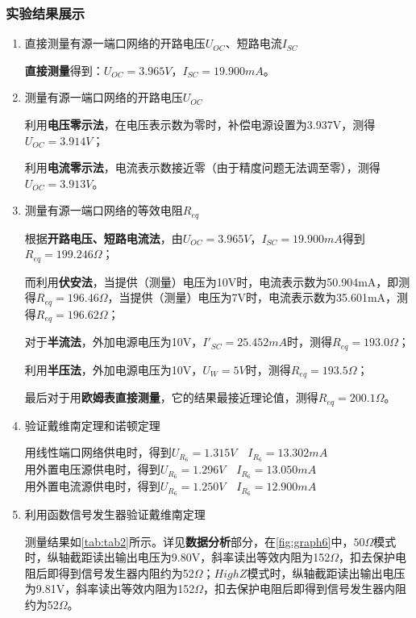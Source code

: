 \documentclass[dvipsnames, svgnames,a4paper,11pt]{article}
\begin{document}
	\subsubsection{实验结果展示}
	\begin{enumerate}
		\item 直接测量有源一端口网络的开路电压$U_{OC}$、短路电流$I_{SC}$
		
		\textbf{直接测量}得到：$U_{OC}=3.965V$，$I_{SC}=19.900mA$。
		
		\item 测量有源一端口网络的开路电压$U_{OC}$
		
		利用\textbf{电压零示法}，在电压表示数为零时，补偿电源设置为3.937V，测得$U_{OC}=3.914V$；
		
		利用\textbf{电流零示法}，电流表示数接近零（由于精度问题无法调至零），测得$U_{OC}=3.913V$。
		
		\item 测量有源一端口网络的等效电阻$R_{eq}$
		
		根据\textbf{开路电压、短路电流法}，由$U_{OC}=3.965V$，$I_{SC}=19.900mA$得到$R_{eq}=199.246\Omega$；
		
		而利用\textbf{伏安法}，当提供（测量）电压为10V时，电流表示数为50.904mA，即测得$R_{eq}=196.46\Omega$，当提供（测量）电压为7V时，电流表示数为35.601mA，测得$R_{eq}=196.62\Omega$；
		
		对于\textbf{半流法}，外加电源电压为10V，$I'_{SC}=25.452mA$时，测得$R_{eq}=193.0\Omega$；
		
		利用\textbf{半压法}，外加电源电压为10V，$U_W=5V$时，测得$R_{eq}=193.5\Omega$；
		
		最后对于用\textbf{欧姆表直接测量}，它的结果最接近理论值，测得$R_{eq}=200.1\Omega$。
		
		\item 验证戴维南定理和诺顿定理
		


			用线性端口网络供电时，得到$U_{R_6}=1.315V \quad I_{R_6}=13.302mA$\\
			用外置电压源供电时，得到$U_{R_6}=1.296V \quad I_{R_6}=13.050mA$\\
			用外置电流源供电时，得到$U_{R_6}=1.250V \quad I_{R_6}=12.900mA$\\

		\item 利用函数信号发生器验证戴维南定理
		


			测量结果如\cref{tab:tab2}所示。详见\textbf{数据分析}部分，在\cref{fig:graph6}中，$50\Omega$模式时，纵轴截距读出输出电压为9.80V，斜率读出等效内阻为152$\Omega$，扣去保护电阻后即得到信号发生器内阻约为52$\Omega$；$HighZ$模式时，纵轴截距读出输出电压为9.81V，斜率读出等效内阻为152$\Omega$，扣去保护电阻后即得到信号发生器内阻约为52$\Omega$。
			

\end{enumerate}
\end{document}
